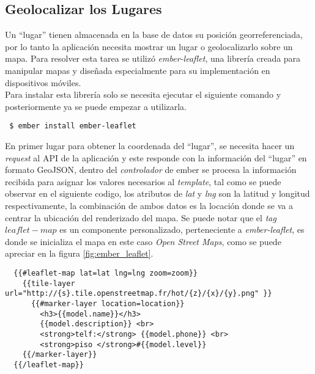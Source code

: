 \subsection{Geolocalizar los Lugares}
\label{sub:fronted_lugares}

Un ``lugar'' tienen almacenada en la base de datos su posición georreferenciada, por lo tanto la aplicación necesita mostrar un lugar o geolocalizarlo sobre un mapa. Para resolver esta tarea se utilizó \emph{ember-leaflet}, una librería creada para manipular mapas y diseñada especialmente  para su implementación en dispositivos móviles.\\

Para instalar esta librería solo se necesita ejecutar el siguiente comando y posteriormente ya se puede empezar a utilizarla.\\

\begin{verbatim}
 $ ember install ember-leaflet
\end{verbatim}


En primer lugar para obtener la coordenada del ``lugar'', se necesita hacer un \emph{request} al API de la aplicación y este responde con la información del ``lugar'' en formato GeoJSON, dentro del \emph{controlador} de ember se procesa la información recibida para asignar los valores necesarios al \emph{template}, tal como se puede observar en el siguiente codigo, los atributos de \emph{lat} y \emph{lng} son la latitud y longitud respectivamente, la combinación de ambos datos es la locación donde se va a centrar la ubicación del renderizado del mapa. Se puede notar que el \emph{tag} $leaflet-map$ es un componente personalizado, perteneciente a \emph{ember-leaflet}, es donde se inicializa el mapa en este caso \emph{Open Street Maps}, como se puede apreciar en la figura \ref{fig:ember_leaflet}.



\begin{verbatim}
  {{#leaflet-map lat=lat lng=lng zoom=zoom}}
    {{tile-layer url="http://{s}.tile.openstreetmap.fr/hot/{z}/{x}/{y}.png" }}
      {{#marker-layer location=location}}
        <h3>{{model.name}}</h3>
        {{model.description}} <br>
        <strong>telf:</strong> {{model.phone}} <br>
        <strong>piso </strong>#{{model.level}}
    {{/marker-layer}}
  {{/leaflet-map}}
\end{verbatim}


